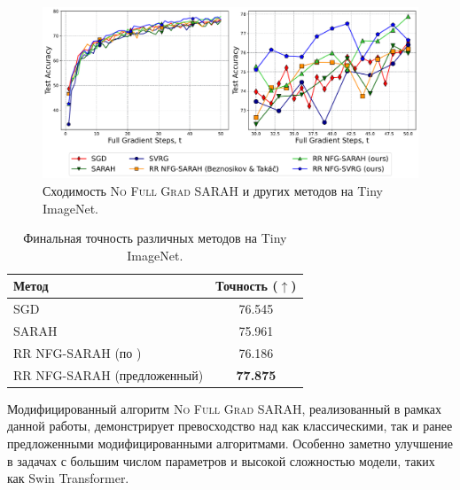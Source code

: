 \begin{figure}[H]
\centering
\includegraphics[width=\textwidth]{plots/vit_results.pdf}
\caption{Сходимость \textsc{No Full Grad SARAH} и других методов на Tiny ImageNet.}
\label{fig:swin_plots}
\end{figure}

\begin{table}[H]
\centering
\caption{Финальная точность различных методов на Tiny ImageNet.}
\label{tab:vit}
\begin{tabular}{l|c}
\toprule
Метод & Точность ($\uparrow$) \\
\midrule
\textsc{SGD} & 76.545 \\
\textsc{SARAH} & 75.961 \\
\textsc{RR NFG-SARAH} (по \cite{beznosikov2023random}) & 76.186 \\
\textsc{RR NFG-SARAH} (предложенный) & \textbf{77.875} \\
\bottomrule
\end{tabular}
\end{table}

Модифицированный алгоритм \textsc{No Full Grad SARAH}, реализованный в рамках данной работы, демонстрирует превосходство над как классическими, так и ранее предложенными модифицированными алгоритмами. Особенно заметно улучшение в задачах с большим числом параметров и высокой сложностью модели, таких как Swin Transformer.

